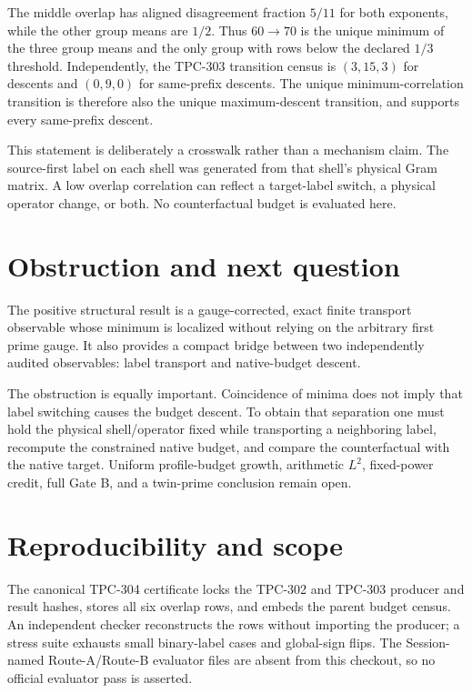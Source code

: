 \documentclass[11pt]{article}
\begin{document}
The middle overlap has aligned disagreement fraction $5/11$ for both
exponents, while the other group means are $1/2$.  Thus $60\to70$ is the
unique minimum of the three group means and the only group with rows below the
declared $1/3$ threshold.  Independently, the TPC-303 transition census is
$(3,15,3)$ for descents and $(0,9,0)$ for same-prefix descents.  The unique
minimum-correlation transition is therefore also the unique maximum-descent
transition, and supports every same-prefix descent.

This statement is deliberately a crosswalk rather than a mechanism claim.
The source-first label on each shell was generated from that shell's physical
Gram matrix.  A low overlap correlation can reflect a target-label switch, a
physical operator change, or both.  No counterfactual budget is evaluated here.

\section{Obstruction and next question}

The positive structural result is a gauge-corrected, exact finite transport
observable whose minimum is localized without relying on the arbitrary first
prime gauge.  It also provides a compact bridge between two independently
audited observables: label transport and native-budget descent.

The obstruction is equally important.  Coincidence of minima does not imply
that label switching causes the budget descent.  To obtain that separation one
must hold the physical shell/operator fixed while transporting a neighboring
label, recompute the constrained native budget, and compare the counterfactual
with the native target.  Uniform profile-budget growth, arithmetic $L^2$,
fixed-power credit, full Gate B, and a twin-prime conclusion remain open.

\section*{Reproducibility and scope}

The canonical TPC-304 certificate locks the TPC-302 and TPC-303 producer and
result hashes, stores all six overlap rows, and embeds the parent budget
census.  An independent checker reconstructs the rows without importing the
producer; a stress suite exhausts small binary-label cases and global-sign
flips.  The Session-named Route-A/Route-B evaluator files are absent from this
checkout, so no official evaluator pass is asserted.



\end{document}

